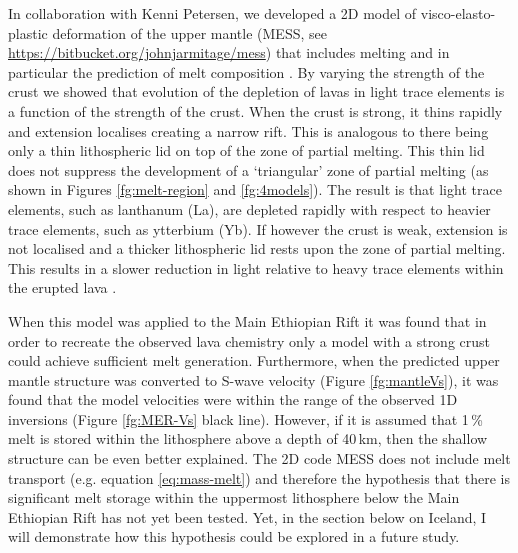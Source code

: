 In collaboration with Kenni Petersen, we developed a 2D model of visco-elasto-plastic deformation of the upper mantle (MESS, see \url{https://bitbucket.org/johnjarmitage/mess}) that includes melting and in particular the prediction of melt composition \citep{petersen-etal-2015,armitage-etal-g3-2018}. By varying the strength of the crust we showed that evolution of the depletion of lavas in light trace elements is a function of the strength of the crust. When the crust is strong, it thins rapidly and extension localises creating a narrow rift. This is analogous to there being only a thin lithospheric lid on top of the zone of partial melting. This thin lid does not suppress the development of a `triangular' zone of partial melting (as shown in Figures \ref{fg:melt-region} and \ref{fg:4models}). The result is that light trace elements, such as lanthanum (La), are depleted rapidly with respect to heavier trace elements, such as ytterbium (Yb). If however the crust is weak, extension is not localised and a thicker lithospheric lid rests upon the zone of partial melting. This results in a slower reduction in light relative to heavy trace elements within the erupted lava \citep{armitage-etal-g3-2018}.

When this model was applied to the Main Ethiopian Rift it was found that in order to recreate the observed lava chemistry only a model with a strong crust could achieve sufficient melt generation. Furthermore, when the predicted upper mantle structure was converted to S-wave velocity (Figure \ref{fg:mantleVs}), it was found that the model velocities were within the range of the observed 1D inversions (Figure \ref{fg:MER-Vs} black line). However, if it is assumed that 1\,\% melt is stored within the lithosphere above a depth of 40\,km, then the shallow structure can be even better explained. The 2D code MESS does not include melt transport (e.g. equation \ref{eq:mass-melt}) and therefore the hypothesis that there is significant melt storage within the uppermost lithosphere below the Main Ethiopian Rift has not yet been tested. Yet, in the section below on Iceland, I will demonstrate how this hypothesis could be explored in a future study.

